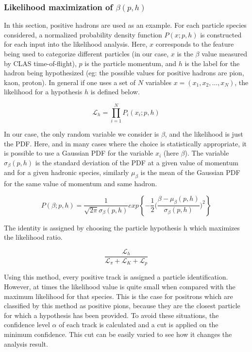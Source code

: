 \subsubsection*{Likelihood maximization of $\beta(p,h)$}
In this section, positive hadrons are used as an example.  For each particle species considered, a normalized probability density function $P(x;p,h)$ is constructed for each input into the likelihood analysis.  Here, $x$ corresponds to the feature being used to categorize different particles (in our case, $x$ is the $\beta$ value measured by CLAS time-of-flight), $p$ is the particle momentum, and $h$ is the label for the hadron being hypothesized (eg: the possible values for positive hadrons are pion, kaon, proton).  In general if one uses a set of $N$ variables $x = (x_1, x_2, ..., x_N)$, the likelihood for a hypothesis $h$ is defined below.

\begin{equation}
  \mathcal{L}_h = \prod^{N}_{i=1} P_{i} (x_i; p, h)
\end{equation}

In our case, the only random variable we consider is $\beta$, and the likelihood is just the PDF.  Here, and in many cases where the choice is statistically appropriate, it is possible to use a Gaussian PDF for the variable $x_i$ (here $\beta$).  The variable $\sigma_{\beta} (p,h)$ is the standard deviation of the PDF at a given value of momentum and for a given hadronic species, similarly $\mu_{\beta}$ is the mean of the Gaussian PDF for the same value of momentum and same hadron. 

\begin{equation}
  P(\beta;p,h) = \frac{1}{\sqrt{2 \pi} \sigma_\beta(p,h) } exp \left \{ -\frac{1}{2} \bigg( \frac{\beta - \mu_\beta(p,h)}{\sigma_\beta(p,h)} \bigg)^2 \right \}
\end{equation}

The identity is assigned by choosing the particle hypothesis h which maximizes the likelihood ratio.  
 
\begin{equation}
  \frac{\mathcal{L}_h}{\mathcal{L}_{\pi}+\mathcal{L}_{K}+\mathcal{L}_{p}}
\end{equation}

Using this method, every positive track is assigned a particle identification.  However, at times the likelihood value is quite small when compared with the maximum likelihood for that species.  This is the case for positrons which are classified by this method as positive pions, because they are the closest particle for which a hypothesis has been provided.  To avoid these situations, the confidence level $\alpha$ of each track is calculated and a cut is applied on the minimum confidence.  This cut can be easily varied to see how it changes the analysis result.

